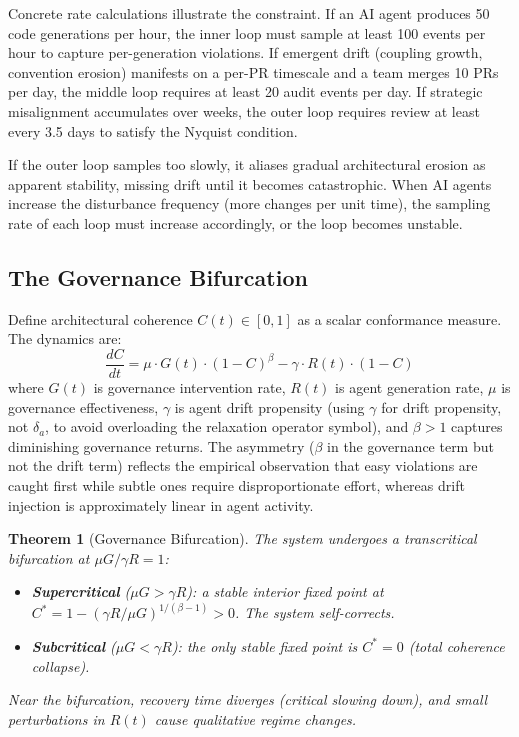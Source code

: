 \documentclass[11pt, a4paper, logo, copyright]{googledeepmind}
\newtheorem{theorem}{Theorem}[section]
\begin{document}
Concrete rate calculations illustrate the constraint. If an AI agent produces 50 code generations per hour, the inner loop must sample at least 100 events per hour to capture per-generation violations. If emergent drift (coupling growth, convention erosion) manifests on a per-PR timescale and a team merges 10 PRs per day, the middle loop requires at least 20 audit events per day. If strategic misalignment accumulates over weeks, the outer loop requires review at least every 3.5 days to satisfy the Nyquist condition.

If the outer loop samples too slowly, it aliases gradual architectural erosion as apparent stability, missing drift until it becomes catastrophic. When AI agents increase the disturbance frequency (more changes per unit time), the sampling rate of each loop must increase accordingly, or the loop becomes unstable.

\subsection{The Governance Bifurcation}

Define architectural coherence $C(t) \in [0,1]$ as a scalar conformance measure. The dynamics are:
\begin{equation}
    \frac{dC}{dt} = \mu \cdot G(t) \cdot (1 - C)^\beta - \gamma \cdot R(t) \cdot (1 - C)
\end{equation}
where $G(t)$ is governance intervention rate, $R(t)$ is agent generation rate, $\mu$ is governance effectiveness, $\gamma$ is agent drift propensity (using $\gamma$ for drift propensity, not $\delta_a$, to avoid overloading the relaxation operator symbol), and $\beta > 1$ captures diminishing governance returns. The asymmetry ($\beta$ in the governance term but not the drift term) reflects the empirical observation that easy violations are caught first while subtle ones require disproportionate effort, whereas drift injection is approximately linear in agent activity.

\begin{theorem}[Governance Bifurcation]
\label{thm:bifurcation}
The system undergoes a transcritical bifurcation at $\mu G / \gamma R = 1$:
\begin{itemize}
    \item \textbf{Supercritical} ($\mu G > \gamma R$): a stable interior fixed point at $C^* = 1 - (\gamma R / \mu G)^{1/(\beta-1)} > 0$. The system self-corrects.
    \item \textbf{Subcritical} ($\mu G < \gamma R$): the only stable fixed point is $C^* = 0$ (total coherence collapse).
\end{itemize}
Near the bifurcation, recovery time diverges (critical slowing down), and small perturbations in $R(t)$ cause qualitative regime changes.
\end{theorem}
\end{document}

